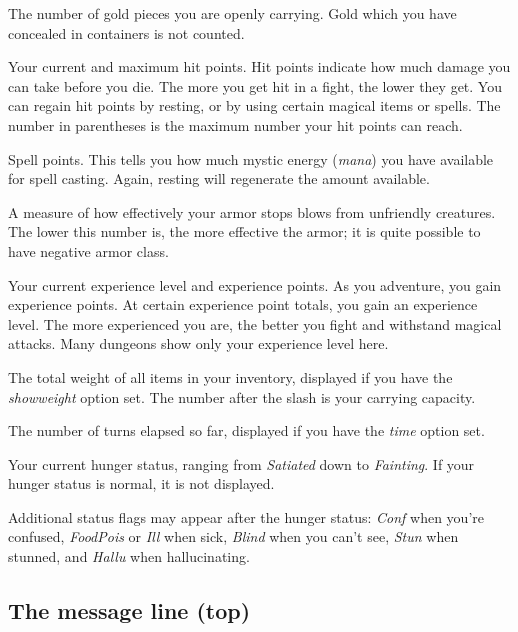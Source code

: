 \item[\bb{Gold}]
The number of gold pieces you are openly carrying.  Gold which you have
concealed in containers is not counted.

\item[\bb{Hit Points}]
Your current and maximum hit points.  Hit points indicate how much
damage you can take before you die.  The more you get hit in a fight,
the lower they get.  You can regain hit points by resting, or by using
certain magical items or spells.  The number in parentheses is the maximum
number your hit points can reach.

\item[\bb{Power}]
Spell points.  This tells you how much mystic energy ({\it mana\/})
you have available for spell casting.  Again, resting will regenerate the
amount available.

\item[\bb{Armor Class}]
A measure of how effectively your armor stops blows from unfriendly
creatures.  The lower this number is, the more effective the armor; it
is quite possible to have negative armor class. 

\item[\bb{Experience}]
Your current experience level and experience points.  As you
adventure, you gain experience points.  At certain experience point
totals, you gain an experience level.  The more experienced you are,
the better you fight and withstand magical attacks.  Many dungeons
show only your experience level here.

\item[\bb{Weight}]
The total weight of all items in your inventory, displayed if you have the
{\it showweight\/} 
option set. The number after the slash is your carrying capacity.

\item[\bb{Time}]
The number of turns elapsed so far, displayed if you have the
{\it time\/} 
option set.

\item[\bb{Hunger status}]
Your current hunger status, ranging from {\it Satiated\/} down to
{\it Fainting}.  If your hunger status is normal, it is not displayed.
\elist
\nd %

Additional status flags may appear after the hunger status:  {\it Conf\/}
when you're confused, {\it FoodPois\/} or {\it Ill\/}
when sick, {\it Blind\/} when you can't
see, {\it Stun\/} when stunned, and {\it Hallu\/} when hallucinating.
\subsection*{The message line (top)}

